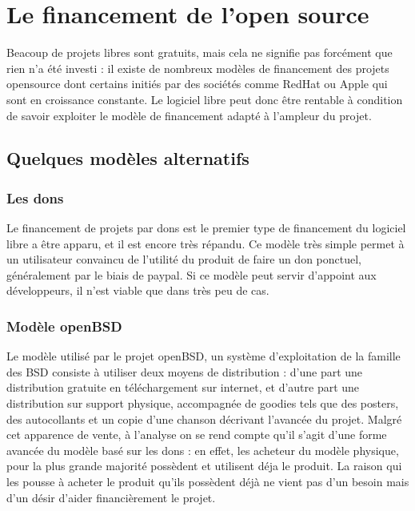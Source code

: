 \chapter{Le financement de l'open source}

Beacoup de projets libres sont gratuits, mais cela ne signifie pas forcément
que rien n'a été investi : il existe de nombreux modèles de financement des
projets opensource dont certains initiés par des sociétés comme RedHat ou Apple
qui sont en croissance constante. Le logiciel libre peut donc être rentable à
condition de savoir exploiter le modèle de financement adapté à l'ampleur du
projet.

\section{Quelques modèles alternatifs}

    \subsection{Les dons}

Le financement de projets par dons est le premier type de financement du 
logiciel libre a être apparu, et il est encore très répandu.
Ce modèle très simple permet à un utilisateur convaincu de l'utilité du 
produit de faire un don ponctuel, généralement par le biais de paypal.
Si ce modèle peut servir d'appoint aux développeurs, il n'est viable que dans 
très peu de cas.

    \subsection{Modèle openBSD}

Le modèle utilisé par le projet openBSD, un système d'exploitation de la 
famille des BSD consiste à utiliser deux moyens de distribution : d'une part 
une distribution gratuite en téléchargement sur internet, et d'autre part une 
distribution sur support physique, accompagnée de goodies tels que des posters,
des autocollants et un copie d'une chanson décrivant l'avancée du projet.
Malgré cet apparence de vente, à l'analyse on se rend compte qu'il s'agit
d'une forme avancée du modèle basé sur les dons : en effet, les acheteur du
modèle physique, pour la plus grande majorité possèdent et utilisent déja le 
produit. La raison qui les pousse à acheter le produit qu'ils possèdent déjà 
ne vient pas d'un besoin mais d'un désir d'aider financièrement le projet.

